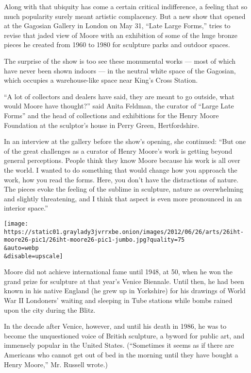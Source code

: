 Along with that ubiquity has come a certain critical indifference, a
feeling that so much popularity surely meant artistic complacency. But a
new show that opened at the Gagosian Gallery in London on May 31, ``Late
Large Forms,'' tries to revise that jaded view of Moore with an
exhibition of some of the huge bronze pieces he created from 1960 to
1980 for sculpture parks and outdoor spaces.

The surprise of the show is too see these monumental works --- most of
which have never been shown indoors --- in the neutral white space of
the Gagosian, which occupies a warehouse-like space near King's Cross
Station.

``A lot of collectors and dealers have said, they are meant to go
outside, what would Moore have thought?'' said Anita Feldman, the
curator of ``Large Late Forms'' and the head of collections and
exhibitions for the Henry Moore Foundation at the sculptor's house in
Perry Green, Hertfordshire.

In an interview at the gallery before the show's opening, she continued:
``But one of the great challenges as a curator of Henry Moore's work is
getting beyond general perceptions. People think they know Moore because
his work is all over the world. I wanted to do something that would
change how you approach the work, how you read the forms. Here, you
don't have the distractions of nature. The pieces evoke the feeling of
the sublime in sculpture, nature as overwhelming and slightly
threatening, and I think that aspect is even more pronounced in an
interior space.''

\texttt{[image: https://static01.graylady3jvrrxbe.onion/images/2012/06/26/arts/26iht-moore26-pic1/26iht-moore26-pic1-jumbo.jpg?quality=75\\\&auto=webp\\\&disable=upscale]}

Moore did not achieve international fame until 1948, at 50, when he won
the grand prize for sculpture at that year's Venice Biennale. Until
then, he had been known in his native England (he grew up in Yorkshire)
for his drawings of World War II Londoners' waiting and sleeping in Tube
stations while bombs rained upon the city during the Blitz.

In the decade after Venice, however, and until his death in 1986, he was
to become the unquestioned voice of British sculpture, a byword for
public art, and immensely popular in the United States. (``Sometimes it
seems as if there are Americans who cannot get out of bed in the morning
until they have bought a Henry Moore,'' Mr. Russell wrote.)

